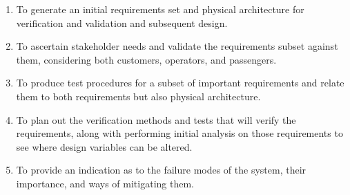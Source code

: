 \documentclass[../main.tex]{subfiles}
\begin{document}
\begin{enumerate}
    \item To generate an initial requirements set and physical architecture for verification and validation and subsequent design.
    \item To ascertain stakeholder needs and validate the requirements subset against them, considering both customers, operators, and passengers.
    \item To produce test procedures for a subset of important requirements and relate them to both requirements but also physical architecture.
    \item To plan out the verification methods and tests that will verify the requirements, along with performing initial analysis on those requirements to see where design variables can be altered.
    \item To provide an indication as to the failure modes of the system, their importance, and ways of mitigating them.
\end{enumerate}
\end{document}
